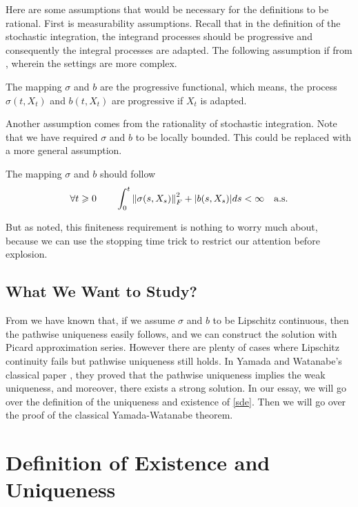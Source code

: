 \documentclass[8pt,onesided]{article}
\begin{document}
\begin{remark}
     Here are some assumptions that would be necessary for the definitions to be rational. First is measurability assumptions. Recall that in the definition of the stochastic integration, the integrand processes should be progressive and consequently the integral processes are adapted. The following assumption if from \cite{rogers2000diffusions2}, wherein the settings are more complex.
    \begin{ass}
         The mapping $\sigma$ and $b$ are the progressive functional, which means, the process $\sigma(t,X_t)$ and $b(t,X_t)$ are progressive if $X_t$ is adapted.
    \end{ass}
    Another assumption comes from the rationality of stochastic integration. Note that we have required $\sigma$ and $b$ to be locally bounded. This could be replaced with a more general assumption. 
    \begin{ass}
    [Finiteness] \label{fin} The mapping $\sigma$ and $b$ should follow
    \begin{equation*}
        \forall t\geqslant 0 \qquad\int_0^t \left\lVert\sigma(s,X_s)\right\rVert_{F}^2 + |b(s,X_s)| ds<\infty\quad \text{a.s.}
    \end{equation*}
    \end{ass}
    But as \cite{rogers2000diffusions2} noted, this finiteness requirement is nothing to worry much about, because we can use the stopping time trick to restrict our attention before explosion.
\end{remark}

\subsection{What We Want to Study?}

From \cite{gall2016brownian} we have known that, if we assume $\sigma$ and $b$ to be Lipschitz continuous, then the pathwise uniqueness easily follows, and we can construct the solution with Picard approximation series. However there are plenty of cases where Lipschitz continuity fails but pathwise uniqueness still holds. In Yamada and Watanabe's classical paper \cite{yamada1971}, they proved that the pathwise uniqueness implies the weak uniqueness, and moreover, there exists a strong solution. In our essay, we will go over the definition of the uniqueness and existence of \ref{sde}. Then we will go over the proof of the classical Yamada-Watanabe theorem.

\section{Definition of Existence and Uniqueness}
\end{document}
